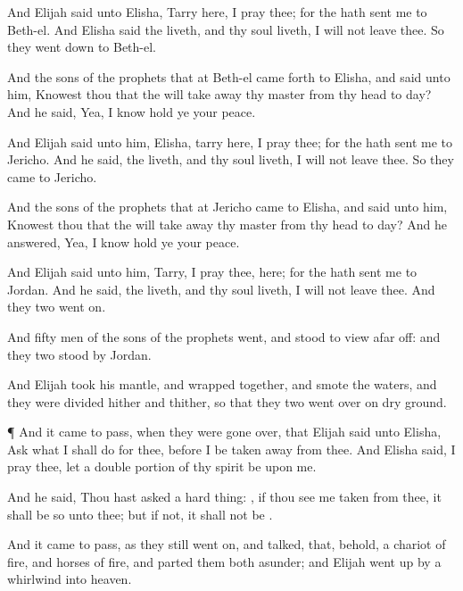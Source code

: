 {And
Elijah
said unto
Elisha,
Tarry here, I pray thee; for the
{} hath
sent me to
Beth-el. And
Elisha
said
{} the
{}
liveth, and
{} thy
soul
liveth, I will not
leave thee. So they went
down to
Beth-el.

And the
sons of the
prophets that
{} at
Beth-el came
forth to
Elisha, and
said unto him,
Knowest thou that the
{} will take
away thy
master from thy
head to
day? And he
said, Yea, I
know
{} hold ye your
peace.

And
Elijah
said unto him,
Elisha,
tarry here, I pray thee; for the
{} hath
sent me to
Jericho. And he
said,
{} the
{}
liveth, and
{} thy
soul
liveth, I will not
leave thee. So they
came to
Jericho.

And the
sons of the
prophets that
{} at
Jericho
came to
Elisha, and
said unto him,
Knowest thou that the
{} will take
away thy
master from thy
head to
day? And he
answered, Yea, I
know
{} hold ye your
peace.

And
Elijah
said unto him,
Tarry, I pray thee, here; for the
{} hath
sent me to
Jordan. And he
said,
{} the
{}
liveth, and
{} thy
soul
liveth, I will not
leave thee. And they
two went
on.

And
fifty
men of the
sons of the
prophets
went, and
stood to
view afar
off: and they
two
stood by
Jordan.

And
Elijah
took his
mantle, and wrapped
{}
together, and
smote the
waters, and they were
divided hither and thither, so that they
two went
over on
dry ground.


\par }{\PP {}¶ And it came to pass, when they were gone
over, that
Elijah
said unto
Elisha,
Ask what I shall
do for thee, before I be taken
away from thee. And
Elisha
said, I pray thee, let a
double
portion of thy
spirit be upon me.

And he
said, Thou hast
asked a hard
thing:
{}, if thou
see me
{}
taken from thee, it shall be so unto thee; but if not, it shall not be
{}.

And it came to pass, as they
still went
on, and
talked, that, behold,
{} a
chariot of
fire, and
horses of
fire, and
parted them
both
asunder; and
Elijah went
up by a
whirlwind into
heaven.


}
